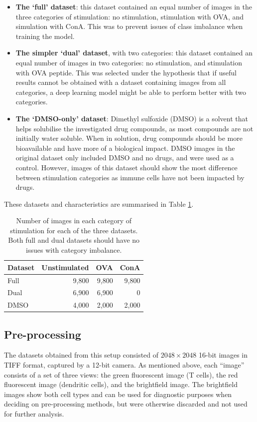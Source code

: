 \begin{itemize}
    \item \textbf{The `full' dataset}: this dataset contained an equal number of images in the three categories of stimulation: no stimulation, stimulation with OVA, and simulation with ConA. This was to prevent issues of class imbalance when training the model. 
    \item \textbf{The simpler `dual' dataset}, with two categories: this dataset contained an equal number of images in two categories: no stimulation, and stimulation with OVA peptide. This was selected under the hypothesis that if useful results cannot be obtained with a dataset containing images from all categories, a deep learning model might be able to perform better with two categories. 
    \item \textbf{The `DMSO-only' dataset}: Dimethyl sulfoxide (DMSO) is a solvent that helps solubilise the investigated drug compounds, as most compounds are not initially water soluble. When in solution, drug compounds should be more bioavailable and have more of a biological impact. DMSO images in the original dataset only included DMSO and no drugs, and were used as a control. However, images of this dataset should show the most difference between stimulation categories as immune cells have not been impacted by drugs.
\end{itemize}

These datasets and characteristics are summarised in Table \ref{table:datasets}.

\begin{table}[h]
\centering
\caption{Number of images in each category of stimulation for each of the three datasets. Both full and dual datasets should have no issues with category imbalance.}
\begin{tabular}{|l|r|r|r|}
\rowcolor[HTML]{EFEFEF} 
\hline
Dataset & Unstimulated & OVA & ConA \\ \hline
Full    & 9,800        & 9,800 & 9,800    \\
Dual    & 6,900        & 6,900 & 0    \\
DMSO    & 4,000        & 2,000   & 2,000   \\ \hline
\end{tabular}
\label{table:datasets}
\end{table}

\subsection{Pre-processing} \label{subsec:preproc}
The datasets obtained from this setup consisted of $2048\times2048$ 16-bit images in TIFF format, captured by a 12-bit camera. As mentioned above, each ``image” consists of a set of three views: the green fluorescent image (T cells), the red fluorescent image (dendritic cells), and the brightfield image. The brightfield images show both cell types and can be used for diagnostic purposes when deciding on pre-processing methods, but were otherwise discarded and not used for further analysis.

